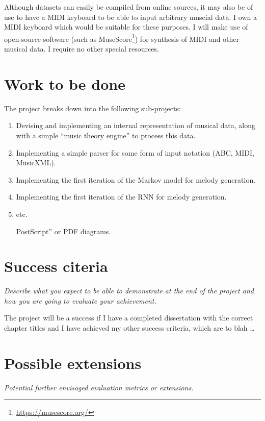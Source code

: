 \documentclass[12pt,a4paper,twoside]{article}
\begin{document}
Although datasets can easily be compiled from online sources, it may also be of use to have a MIDI keyboard to be able to input arbitrary muscial data. I own a MIDI keyboard which would be suitable for these purposes. I will make use of open-source software (such as MuseScore\footnote{\url{https://musescore.org/}}) for synthesis of MIDI and other musical data. I require no other special resources.

\section*{Work to be done}

The project breaks down into the following sub-projects:

\begin{enumerate}

\item Devising and implementing an internal representation of musical data, along with a simple ``music theory engine'' to process this data.
\item Implementing a simple parser for some form of input notation (ABC, MIDI, MusicXML).
\item Implementing the first iteration of the Markov model for melody generation.
\item Implementing the first iteration of the RNN for melody generation.
\item etc.
	
  PostScript'' or PDF diagrams.

\end{enumerate}

\section*{Success citeria}

\emph{Describe what you expect to be able to demonstrate at the
end of the project and how you are going to evaluate your achievement.}

The project will be a success if I have a completed dissertation with
the correct chapter titles and I have achieved my other success
criteria, which are to blah \ldots


\section*{Possible extensions}

{\em Potential further envisaged evaluation metrics or extensions.}
\end{document}
